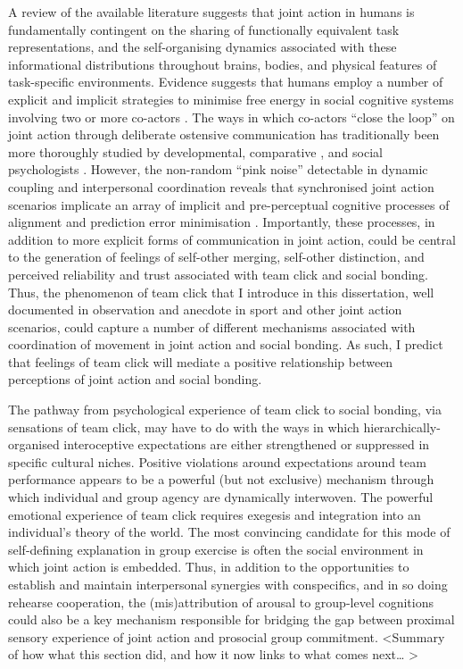 \begin{CJK}{UTF8}{gbsn}
{A review of the available literature suggests that joint action in humans is fundamentally contingent on the sharing of functionally equivalent task representations, and the self-organising dynamics associated with these informational distributions throughout brains, bodies, and physical features of task-specific environments.  Evidence suggests that humans employ a number of explicit and implicit strategies to minimise free energy in social cognitive systems involving two or more co-actors \citep{Semin2008,Frith2010}. The ways in which co-actors ``close the loop'' \citep{Frith2007} on joint action through deliberate ostensive communication has traditionally been more thoroughly studied by developmental, comparative \cite{Tomasello2005a}, and social psychologists \citep{Sebanz2006}.
However, the non-random ``pink noise'' detectable in dynamic coupling and interpersonal coordination reveals that synchronised joint action scenarios implicate an array of implicit and pre-perceptual cognitive processes of alignment and prediction error minimisation \citep{Schmidt2011}. Importantly, these processes, in addition to more explicit forms of communication in joint action, could be central to the generation of feelings of self-other merging, self-other distinction, and perceived reliability and trust associated with team click and social bonding.  Thus, the phenomenon of team click that I introduce in this dissertation, well documented in observation and anecdote in sport and other joint action scenarios, could capture a number of different mechanisms associated with coordination of movement in joint action and social bonding.  As such, I predict that feelings of team click will mediate a positive relationship between perceptions of joint action and social bonding.

The pathway from psychological experience of team click to social bonding, via sensations of team click, may have to do with the ways in which hierarchically-organised interoceptive expectations are either strengthened or suppressed in specific cultural niches.  Positive violations around expectations around team performance appears to be a powerful (but not exclusive) mechanism through which individual and group agency are dynamically interwoven.
The powerful emotional experience of team click requires exegesis and integration into an individual's theory of the world.  The most convincing candidate for this mode of self-defining explanation in group exercise is often the social environment in which joint action is embedded.  Thus, in addition to the opportunities to establish and maintain interpersonal synergies with conspecifics, and in so doing rehearse cooperation, the (mis)attribution of arousal \citep{Drachman1976} to group-level cognitions could also be a key mechanism responsible for bridging the gap between proximal sensory experience of joint action and prosocial group commitment.
<Summary of how what this section did, and how it now links to what comes next… >

}
\end{CJK}
